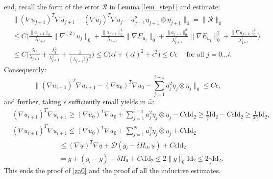 \documentclass[reqno,twoside,11pt]{amsart}
\newcommand{\Id}{\mathrm{Id}}
\numberwithin{equation}{section}
\theoremstyle{plain}
\theoremstyle{definition}
\begin{document}
end, recall the form of the error $\mathcal{R}$ in Lemma \ref{lem_step1} and estimate:
\begin{equation*}
\begin{split}
& \|(\nabla u_{j+1})^T \nabla u_{j+1} - (\nabla u_{j})^T \nabla u_{j} -
a_{j+1}^2\eta_{j+1}\otimes\eta_{j+1}\|_0 = \|\mathcal{R}\|_0
\\ & \leq C \Big(\frac{\|a_{j+1}\|_0}{\lambda_{j+1}} \|\nabla^{(2)}u_j\|_0
+ \frac{\|a_{j+1}\|^2_0}{\lambda_{j+1}} \|\nabla E_{u_j}\|_0
+ \frac{\|a_{j+1}\|^2_0}{\lambda_{j+1}^2} \|\nabla E_{u_j}\|_0^2 +
\frac{\|\nabla a_{j+1}\|^2_0}{\lambda_{j+1}^2}\Big)  \\ & 
\leq C\Big(\frac{\lambda_j}{\lambda_{j+1}}+ \frac{\lambda_j^2}{\lambda_{j+1}^2}+
\frac{1}{(\lambda_{j+1}l)^2}\Big) \leq C\big(\epsilon l +(\epsilon l)^2 +\epsilon^2\big)
\leq C \epsilon \quad \mbox{ for all } j=0\ldots i.
\end{split}
\end{equation*}
Consequently:
\begin{equation}\label{b5} 
\|(\nabla u_{i+1})^T \nabla u_{i+1} - (\nabla u_0)^T \nabla u_0 -
\sum_{j=1}^{i+1}a_j^2\eta_j\otimes\eta_j \|_0\leq C\epsilon, 
\end{equation}
and further, taking $\epsilon$ sufficiently small yields in $\bar\omega$:
\begin{equation*}
\begin{split} 
& (\nabla u_{i+1})^T \nabla u_{i+1} \geq (\nabla u_0)^T \nabla u_{0} +
\sum_{j=1}^{i+1}a_j^2\eta_j\otimes\eta_j  - C\epsilon\Id_2 \geq 
\frac{1}{\underline\gamma}\Id_2 - C\epsilon\Id_2 \geq 
\frac{1}{2\underline\gamma} \Id_2,
\\ &  (\nabla u_{i+1})^T \nabla u_{i+1} \leq (\nabla u_0)^T \nabla u_{0} +
\sum_{j=1}^{N}a_j^2\eta_j\otimes\eta_j  + C\epsilon\Id_2 \\ &
\qquad\qquad\qquad \;\; \; \leq
(\nabla\underline u)^T\nabla \underline u + \mathcal{D}(g_l-\delta
H_0, \underline u) + C\epsilon\Id_2 \\ &
\qquad\qquad\qquad \;\; \; = g+ (g_l-g) -\delta H_0 + 
C\epsilon\Id_2 \leq 2\|g\|_0\Id_2 \leq 2\underline\gamma\Id_2.
\end{split}
\end{equation*}
This ends the proof of \ref{za0} and the proof of all the inductive estimates.

\smallskip
\end{document}

